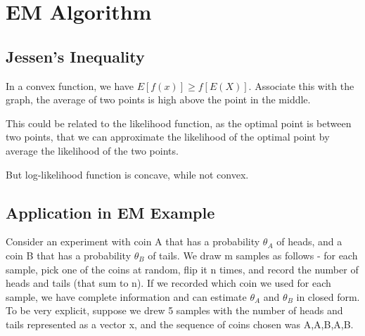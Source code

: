 \section{EM Algorithm}

\subsection{Jessen's Inequality}
In a convex function, we have $E[f(x)] \geq f[E(X)]$. Associate this with the graph, the average of two points is high above the point in the middle.

This could be related to the likelihood function, as the optimal point is between two points, that we can approximate the likelihood of the optimal point by average the likelihood of the two points.

But log-likelihood function is concave, while not convex. 

\subsection{Application in EM Example}

Consider an experiment with coin A that has a probability $\theta_A$ of heads, and a coin B that has a probability $\theta_B$ of tails. We draw m samples as follows - for each sample, pick one of the coins at random, flip it n times, and record the number of heads and tails (that sum to n). If we recorded which coin we used for each sample, we have complete information and can estimate $\theta_A$ and $\theta_B$ in closed form. To be very explicit, suppose we drew 5 samples with the number of heads and tails represented as a vector x, and the sequence of coins chosen was A,A,B,A,B. 

